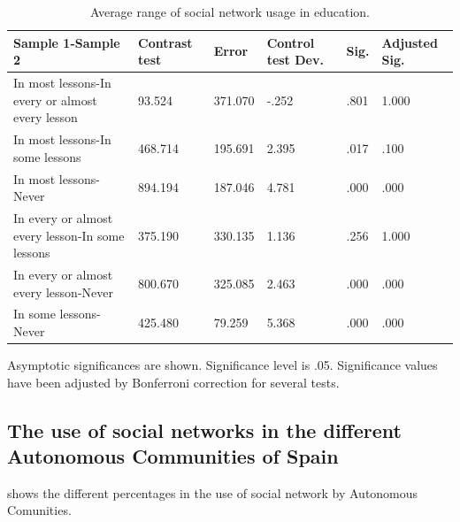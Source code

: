 \documentclass{textolivre}
\begin{document}
\begin{table}[htpb]
\caption{Average range of social network usage in education.}
\label{tbl-tabela-02}
\begin{tabularx}{\textwidth}{lXXXXX}
\toprule 
Sample 1-Sample 2 & Contrast test & Error & Control test Dev. & Sig. & Adjusted Sig.\\
\midrule
In most lessons-In every or almost every lesson & 93.524 & 371.070 & -.252 & .801 & 1.000 \\ 
In most lessons-In some lessons &
468.714 & 195.691 & 2.395 & .017 & .100 \\
In most lessons-Never & 894.194 & 187.046 & 4.781 & .000 & .000 \\ 
In every or almost every lesson-In some lessons & 375.190 & 330.135 & 1.136 & .256 & 1.000 \\
In every or almost every lesson-Never &
800.670 & 325.085 & 2.463 & .000 & .000 \\
In some lessons-Never & 425.480 & 79.259 & 5.368 & .000 & .000 \\
\bottomrule
\end{tabularx}

\vspace{1ex}
{\raggedright \footnotesize Asymptotic significances are shown. Significance level is .05. Significance values have been adjusted by Bonferroni correction for several tests. \par}

\end{table}

\subsection{The use of social networks in the different Autonomous Communities of Spain}\label{sec-use}

 shows the different percentages in the use of social network by Autonomous Comunities.
\end{document}
